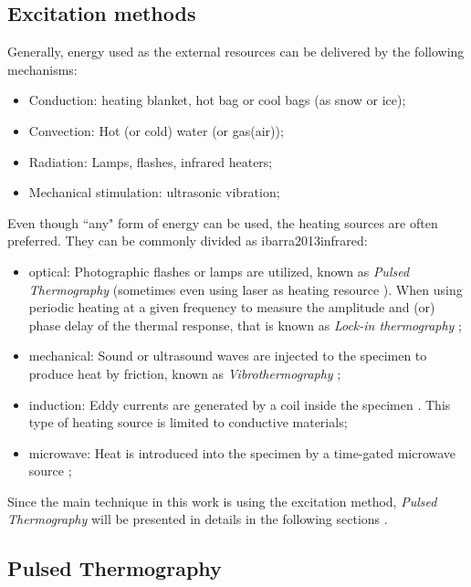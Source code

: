 \subsection*{Excitation methods}
Generally, energy used as the external resources can be delivered by the following mechanisms:
\begin{itemize}
	\item Conduction: heating blanket, hot bag or cool bags (as snow or ice);
	\item Convection: Hot (or cold) water (or gas(air));
	\item Radiation: Lamps, flashes, infrared heaters;
	\item Mechanical stimulation: ultrasonic vibration;
\end{itemize}
Even though ``any" form of energy can be used, the heating sources are often preferred. They can be commonly divided as {ibarra2013infrared}:
\begin{itemize}
	\item optical: Photographic flashes or lamps are utilized, known as \textit{Pulsed Thermography} (sometimes even using laser as heating resource \citep{suzuki2002application,burrows2007combined}). When using periodic heating at a given frequency to measure the amplitude and (or) phase delay  of the thermal response, that is known as \textit{Lock-in thermography} \citep{wu1998lock,duan2013quantitative,2007-Ibarra-Castanedo};
	\item mechanical: Sound or ultrasound waves are injected to the specimen to produce heat by friction, known as \textit{Vibrothermography} \citep{2007-ClementeIbarra-Castanedo,2007-Ibarra-Castanedo};
	\item induction: Eddy currents are generated by a coil inside the specimen \citep{riegert2004lockin,zenzinger2007thermographic}. This type of heating source is limited to conductive materials;
	\item microwave: Heat is introduced into the specimen by a time-gated microwave source \citep{myers1979microwave,land1987clinical};
\end{itemize}
Since the main technique in this work is using the excitation method, \textit{Pulsed Thermography} will be presented in details in the following sections \citep{Maldague2001theory,ibarra2013infrared}.
\subsection{Pulsed Thermography}

